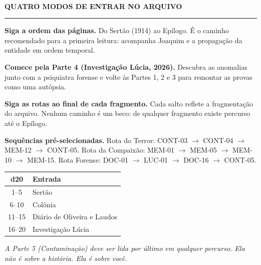 \cleardoublepage
\thispagestyle{empty}
\begin{rpgdark}
\centering
{}\\[0.25em]
{\scshape\bfseries\small QUATRO MODOS DE ENTRAR NO ARQUIVO}\\[0.35em]
{\color{rpggold}\rule{0.55\textwidth}{0.7pt}}
\end{rpgdark}

\vspace{0.5em}

\vspace{0.6em}
\begin{rpgbox}
{\color{rpgblood}}\enspace \textbf{Siga a ordem das páginas.} Do Sertão (1914) ao Epílogo. É o caminho recomendado para a primeira leitura: acompanha Joaquim e a propagação da entidade em ordem temporal.
\end{rpgbox}

\begin{rpgbox}
{\color{rpgblood}}\enspace \textbf{Comece pela Parte 4 (Investigação Lúcia, 2026).} Descubra as anomalias junto com a psiquiatra forense e volte às Partes 1, 2 e 3 para remontar as provas como uma autópsia.
\end{rpgbox}

\begin{rpgbox}
{\color{rpgblood}}\enspace \textbf{Siga as rotas ao final de cada fragmento.} Cada salto reflete a fragmentação do arquivo. Nenhum caminho é um beco: de qualquer fragmento existe percurso até o Epílogo.
\end{rpgbox}

\begin{rpgbox}
{\color{rpgblood}}\enspace \textbf{Sequências pré-selecionadas.} Rota do Terror: CONT-03 $\to$ CONT-04 $\to$ MEM-12 $\to$ CONT-05. Rota da Compaixão: MEM-01 $\to$ MEM-05 $\to$ MEM-10 $\to$ MEM-15. Rota Forense: DOC-01 $\to$ LUC-01 $\to$ DOC-16 $\to$ CONT-05.
\end{rpgbox}

\vspace{0.5em}
\begin{rpgbox}
\centering
\small
\begin{tabular}{@{}cl@{}}
\toprule
\textbf{d20} & \textbf{Entrada} \\
\midrule
1--5 & Sertão \\
6--10 & Colônia \\
11--15 & Diário de Oliveira e Laudos \\
16--20 & Investigação Lúcia \\
\bottomrule
\end{tabular}

\vspace{0.4em}
{\itshape A Parte 5 (Contaminação) deve ser lida por último em qualquer percurso. Ela não é sobre a história. Ela é sobre você.}
\end{rpgbox}

